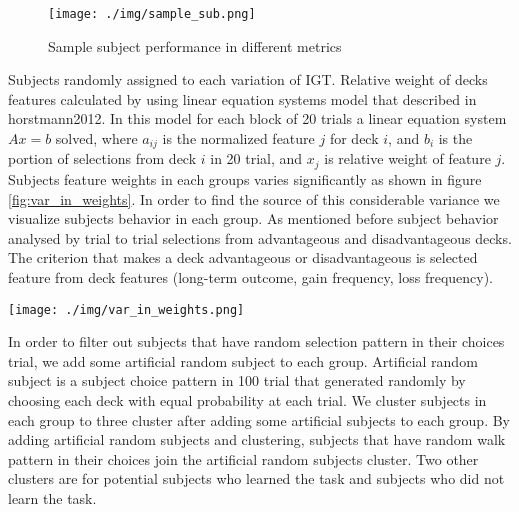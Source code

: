 \documentclass[12pt,twocolumn]{elsarticle}
\begin{document}
\begin{figure}
\caption{Sample subject performance in different metrics}
\label{fig:sample_sub}
\centering
\texttt{[image: ./img/sample\_sub.png]}
\end{figure}

Subjects randomly assigned to each variation of IGT.
Relative weight of decks features calculated  by using
linear equation systems model that described in
horstmann2012. In this model for each block of 20 trials a
linear equation system $Ax = b$ solved, where $ a_{ij} $ is the
normalized feature $j$ for deck $i$, and $ b_i $ is the portion of
selections from deck $i$ in 20 trial, and $ x_j $  is relative weight of
feature $j$. Subjects feature weights in each groups varies
significantly as shown in figure \ref{fig:var_in_weights}. In order to find the
source of this considerable variance we visualize subjects
behavior in each group. As mentioned before subject behavior
analysed by trial to trial selections from advantageous and disadvantageous
decks. The criterion that makes a deck advantageous or disadvantageous is
selected feature from deck features (long-term outcome, gain frequency, loss
frequency). 


\begin{figure*}
\caption{Calculated feature weights for each block}
\label{fig:var_in_weights}
\centering
\texttt{[image: ./img/var\_in\_weights.png]}
\end{figure*}

In order to filter out subjects that have random selection
pattern in their choices trial, we add some artificial random
subject to each group. Artificial random subject is a
subject choice pattern in 100 trial that generated randomly
by choosing each deck with equal probability at each trial.
We cluster subjects in each group to three cluster after
adding some artificial subjects to each group. By adding
artificial random subjects and clustering, subjects that
have random walk pattern in their choices join the
artificial random subjects cluster. Two other clusters are
for potential subjects who learned the task and subjects who
did not learn the task.
\end{document}

